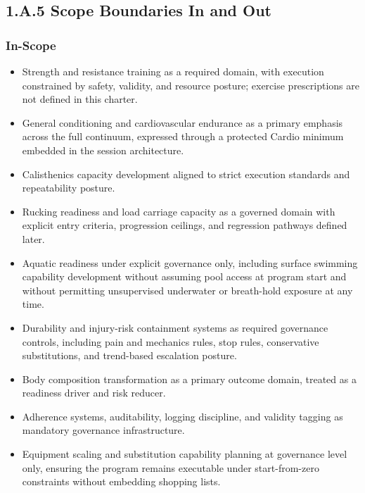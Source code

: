 \documentclass[10pt]{article}
\begin{document}
\endgroup

\subsection*{1.A.5 Scope Boundaries In and Out}
{}

\subsubsection*{In-Scope}

\begin{itemize}
\item Strength and resistance training as a required domain, with execution constrained by safety, validity, and resource posture; exercise prescriptions are not defined in this charter.
\item General conditioning and cardiovascular endurance as a primary emphasis across the full continuum, expressed through a protected Cardio minimum embedded in the session architecture.
\item Calisthenics capacity development aligned to strict execution standards and repeatability posture.
\item Rucking readiness and load carriage capacity as a governed domain with explicit entry criteria, progression ceilings, and regression pathways defined later.
\item Aquatic readiness under explicit governance only, including surface swimming capability development without assuming pool access at program start and without permitting unsupervised underwater or breath-hold exposure at any time.
\item Durability and injury-risk containment systems as required governance controls, including pain and mechanics rules, stop rules, conservative substitutions, and trend-based escalation posture.
\item Body composition transformation as a primary outcome domain, treated as a readiness driver and risk reducer.
\item Adherence systems, auditability, logging discipline, and validity tagging as mandatory governance infrastructure.
\item Equipment scaling and substitution capability planning at governance level only, ensuring the program remains executable under start-from-zero constraints without embedding shopping lists.
\end{itemize}
\end{document}
